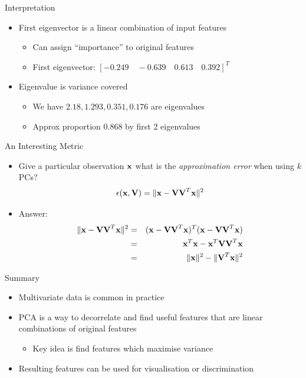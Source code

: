\documentclass{beamer}
\begin{document}
\begin{frame}{Interpretation} 
\begin{itemize} 
 \item First eigenvector is a linear combination of input features 
 \begin{itemize}
  \item Can assign ``importance'' to original features 
  \item First eigenvector: $[-0.249 \quad -0.639 \quad 0.613 \quad 0.392]^T$
 \end{itemize} 
 \item Eigenvalue is variance covered
 \begin{itemize}
  \item We have $2.18, 1.293, 0.351, 0.176$ are eigenvalues 
  \item Approx proportion $0.868$ by first 2 eigenvalues 
  \end{itemize}
\end{itemize} 
\end{frame}

\begin{frame}{An Interesting Metric} 
\begin{itemize} 
 \item Give a particular observation $\textbf{x}$ what is the \emph{approximation error} when using $k$ PCs?
 \begin{displaymath} 
  \epsilon(\textbf{x}, \textbf{V}) = \|\textbf{x} - \textbf{V}\textbf{V}^T\textbf{x}\|^2
 \end{displaymath}
\item Answer:
\begin{eqnarray*} 
  \|\textbf{x} - \textbf{V}\textbf{V}^T\textbf{x}\|^2 &=& (\textbf{x} - \textbf{V}\textbf{V}^T\textbf{x})^T (\textbf{x} - \textbf{V}\textbf{V}^T\textbf{x}) \\ 
   &=& \textbf{x}^T\textbf{x} - \textbf{x}^T\textbf{V}\textbf{V}^T\textbf{x} \\ 
   &=& \|\textbf{x}\|^2 - \|\textbf{V}^T\textbf{x}\|^2
\end{eqnarray*}
\end{itemize}
\end{frame}

\begin{frame}{Summary} 
\begin{itemize}
 \item Multivariate data is common in practice 
 \item PCA is a way to decorrelate and find useful features that are linear combinations of original features 
 \begin{itemize}
  \item Key idea is find features which maximise variance 
 \end{itemize}
 \item Resulting features can be used for visualisation or discrimination 
\end{itemize}
\end{frame}
\end{document}
